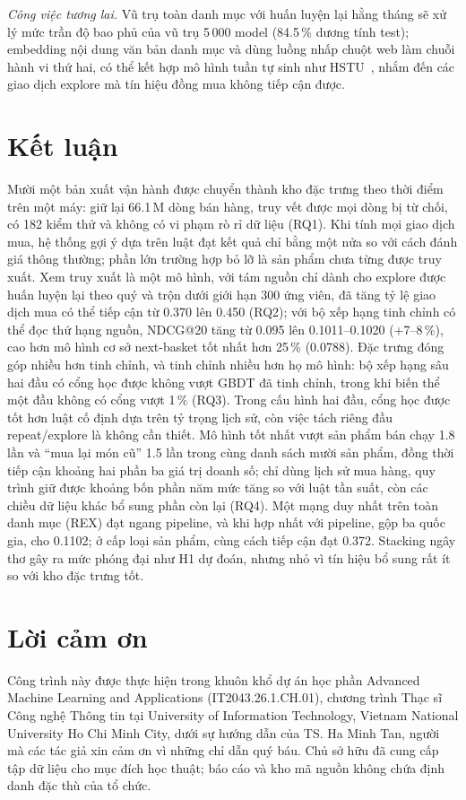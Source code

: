 \documentclass[jtehm]{ieeeaccess}
\makeatletter
\newcommand{\nRefUncond}{0.095}      %
\newcommand{\nCandOld}{0.370}        %
\newcommand{\nCandNew}{0.450}        %
\newcommand{\nBest}{0.1020}          %
\newcommand{\nTuned}{0.1011}         %
\newcommand{\nBaseline}{0.0788}      %
\makeatother
\begin{document}
\textit{Công việc tương lai.} Vũ trụ toàn danh mục với huấn luyện lại hằng tháng sẽ xử lý mức trần độ bao phủ của vũ trụ 5\,000 model (84.5\,\% dương tính test); embedding nội dung văn bản danh mục và dùng luồng nhấp chuột web làm chuỗi hành vi thứ hai, có thể kết hợp mô hình tuần tự sinh như HSTU~\cite{zhai2024hstu}, nhắm đến các giao dịch explore mà tín hiệu đồng mua không tiếp cận được.

\section{Kết luận}
\label{sec:conclusion}

Mười một bản xuất vận hành được chuyển thành kho đặc trưng theo thời điểm trên một máy: giữ lại 66.1\,M dòng bán hàng, truy vết được mọi dòng bị từ chối, có 182 kiểm thử và không có vi phạm rò rỉ dữ liệu (RQ1). Khi tính mọi giao dịch mua, hệ thống gợi ý dựa trên luật đạt kết quả chỉ bằng một nửa so với cách đánh giá thông thường; phần lớn trường hợp bỏ lỡ là sản phẩm chưa từng được truy xuất. Xem truy xuất là một mô hình, với tám nguồn chỉ dành cho explore được huấn luyện lại theo quý và trộn dưới giới hạn 300 ứng viên, đã tăng tỷ lệ giao dịch mua có thể tiếp cận từ \nCandOld{} lên \nCandNew{} (RQ2); với bộ xếp hạng tinh chỉnh có thể đọc thứ hạng nguồn, NDCG@20 tăng từ \nRefUncond{} lên \nTuned{}--\nBest{} (+7--8\,\%), cao hơn mô hình cơ sở next-basket tốt nhất hơn 25\,\% (\nBaseline{}). Đặc trưng đóng góp nhiều hơn tinh chỉnh, và tinh chỉnh nhiều hơn họ mô hình: bộ xếp hạng sâu hai đầu có cổng học được không vượt GBDT đã tinh chỉnh, trong khi biến thể một đầu không có cổng vượt 1\,\% (RQ3). Trong cấu hình hai đầu, cổng học được tốt hơn luật cố định dựa trên tỷ trọng lịch sử, còn việc tách riêng đầu repeat/explore là không cần thiết. Mô hình tốt nhất vượt sản phẩm bán chạy 1.8 lần và ``mua lại món cũ'' 1.5 lần trong cùng danh sách mười sản phẩm, đồng thời tiếp cận khoảng hai phần ba giá trị doanh số; chỉ dùng lịch sử mua hàng, quy trình giữ được khoảng bốn phần năm mức tăng so với luật tần suất, còn các chiều dữ liệu khác bổ sung phần còn lại (RQ4). Một mạng duy nhất trên toàn danh mục (REX) đạt ngang pipeline, và khi hợp nhất với pipeline, gộp ba quốc gia, cho 0.1102; ở cấp loại sản phẩm, cùng cách tiếp cận đạt 0.372. Stacking ngây thơ gây ra mức phóng đại như H1 dự đoán, nhưng nhỏ vì tín hiệu bổ sung rất ít so với kho đặc trưng tốt.

\section*{Lời cảm ơn}
Công trình này được thực hiện trong khuôn khổ dự án học phần Advanced Machine Learning and Applications (IT2043.26.1.CH.01), chương trình Thạc sĩ Công nghệ Thông tin tại University of Information Technology, Vietnam National University Ho Chi Minh City, dưới sự hướng dẫn của TS. Ha Minh Tan, người mà các tác giả xin cảm ơn vì những chỉ dẫn quý báu. Chủ sở hữu đã cung cấp tập dữ liệu cho mục đích học thuật; báo cáo và kho mã nguồn không chứa định danh đặc thù của tổ chức.



\EOD
\end{document}
